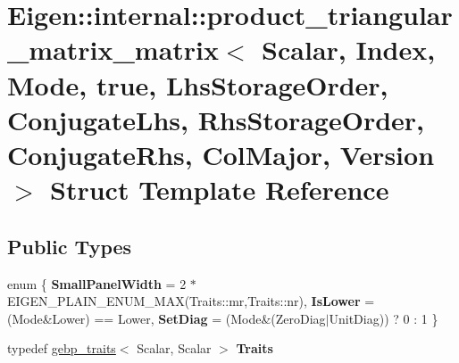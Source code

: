 \hypertarget{struct_eigen_1_1internal_1_1product__triangular__matrix__matrix_3_01_scalar_00_01_index_00_01_mocecf6b0a946de08ae1ae622ae91f7d88}{}\section{Eigen\+::internal\+::product\+\_\+triangular\+\_\+matrix\+\_\+matrix$<$ Scalar, Index, Mode, true, Lhs\+Storage\+Order, Conjugate\+Lhs, Rhs\+Storage\+Order, Conjugate\+Rhs, Col\+Major, Version $>$ Struct Template Reference}
\label{struct_eigen_1_1internal_1_1product__triangular__matrix__matrix_3_01_scalar_00_01_index_00_01_mocecf6b0a946de08ae1ae622ae91f7d88}
\subsection*{Public Types}
\begin{DoxyCompactItemize}
\item 
\mbox{\label{struct_eigen_1_1internal_1_1product__triangular__matrix__matrix_3_01_scalar_00_01_index_00_01_mocecf6b0a946de08ae1ae622ae91f7d88_ad0be60d307bb134498b87c23c57f335d}} 
enum \{ {\bfseries Small\+Panel\+Width} = 2 $\ast$ E\+I\+G\+E\+N\+\_\+\+P\+L\+A\+I\+N\+\_\+\+E\+N\+U\+M\+\_\+\+M\+AX(Traits\+::mr,Traits\+::nr), 
{\bfseries Is\+Lower} = (Mode\&Lower) == Lower, 
{\bfseries Set\+Diag} = (Mode\&(Zero\+Diag$\vert$\+Unit\+Diag)) ? 0 \+: 1
 \}
\item 
\mbox{\label{struct_eigen_1_1internal_1_1product__triangular__matrix__matrix_3_01_scalar_00_01_index_00_01_mocecf6b0a946de08ae1ae622ae91f7d88_a259733da8fa6b08909126e3026dcfbc7}} 
typedef \mbox{\hyperlink{class_eigen_1_1internal_1_1gebp__traits}{gebp\+\_\+traits}}$<$ Scalar, Scalar $>$ {\bfseries Traits}
\end{DoxyCompactItemize}
